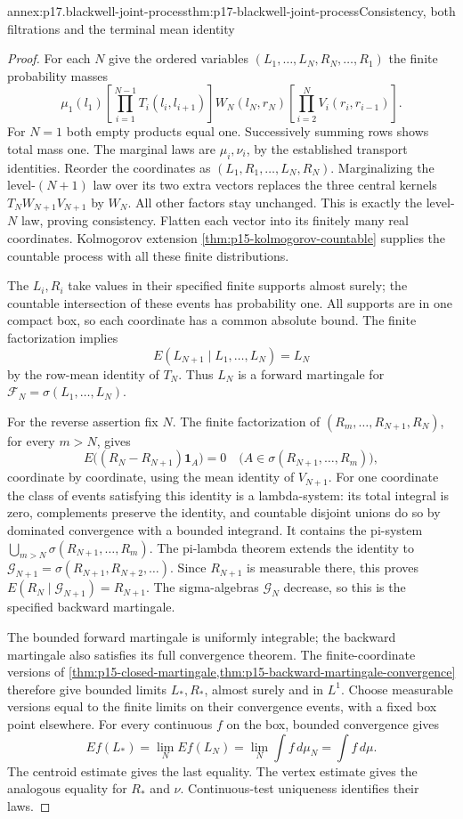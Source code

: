 \begin{annexitem}{annex:p17.blackwell-joint-process}{thm:p17-blackwell-joint-process}{Consistency, both filtrations and the terminal mean identity}
\begin{proof}
For each \(N\) give the ordered variables
\((L_1,\ldots,L_N,R_N,\ldots,R_1)\) the finite probability masses
\[
 \mu_1(l_1)
 \left[\prod_{i=1}^{N-1}T_i(l_i,l_{i+1})\right]
 W_N(l_N,r_N)
 \left[\prod_{i=2}^{N}V_i(r_i,r_{i-1})\right].
\]
For \(N=1\) both empty products equal one.
Successively summing rows shows total mass one.
The marginal laws are \(\mu_i,\nu_i\), by the established transport
identities. Reorder the coordinates as
\((L_1,R_1,\ldots,L_N,R_N)\).
Marginalizing the level-\((N+1)\) law over its two extra vectors
replaces the three central kernels
\(T_NW_{N+1}V_{N+1}\) by \(W_N\).
All other factors stay unchanged. This is exactly the level-\(N\)
law, proving consistency.
Flatten each vector into its finitely many real coordinates.
Kolmogorov extension
\cref{thm:p15-kolmogorov-countable} supplies the countable process
with all these finite distributions.

The \(L_i,R_i\) take values in their specified finite supports
almost surely; the countable intersection of these events has
probability one. All supports are in one compact box, so each
coordinate has a common absolute bound. The finite factorization
implies
\[
        E(L_{N+1}\mid L_1,\ldots,L_N)=L_N
\]
by the row-mean identity of \(T_N\). Thus \(L_N\) is a forward
martingale for \(\mathcal F_N=\sigma(L_1,\ldots,L_N)\).

For the reverse assertion fix \(N\). The finite factorization of
\((R_m,\ldots,R_{N+1},R_N)\), for every \(m>N\), gives
\[
 E\bigl((R_N-R_{N+1})\mathbf1_A\bigr)=0
                \quad\bigl(A\in\sigma(R_{N+1},\ldots,R_m)\bigr),
\]
coordinate by coordinate, using the mean identity of \(V_{N+1}\).
For one coordinate the class of events satisfying this identity
is a lambda-system: its total integral is zero, complements preserve
the identity, and countable disjoint unions do so by dominated
convergence with a bounded integrand. It contains the pi-system
\(\bigcup_{m>N}\sigma(R_{N+1},\ldots,R_m)\).
The pi-lambda theorem extends the identity to
\(\mathcal G_{N+1}=\sigma(R_{N+1},R_{N+2},\ldots)\).
Since \(R_{N+1}\) is measurable there, this proves
\(E(R_N\mid\mathcal G_{N+1})=R_{N+1}\).
The sigma-algebras \(\mathcal G_N\) decrease, so this is the
specified backward martingale.

The bounded forward martingale is uniformly integrable; the backward
martingale also satisfies its full convergence theorem.
The finite-coordinate versions of
\cref{thm:p15-closed-martingale,thm:p15-backward-martingale-convergence}
therefore give bounded limits \(L_*,R_*\), almost surely and in \(L^1\).
Choose measurable versions equal to the finite limits on their
convergence events, with a fixed box point elsewhere.
For every continuous \(f\) on the box, bounded convergence gives
\[
 E f(L_*)=\lim_NEf(L_N)=\lim_N\int f\,d\mu_N=\int f\,d\mu .
\]
The centroid estimate gives the last equality. The vertex estimate
gives the analogous equality for \(R_*\) and \(\nu\).
Continuous-test uniqueness identifies their laws.


\end{proof}
\end{annexitem}
